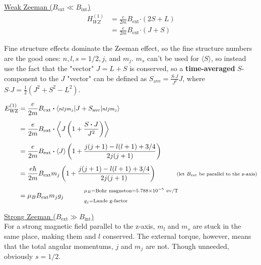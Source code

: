 \documentclass[12pt]{article}
\newcommand*{\dotP}{\boldsymbol \cdot}	%
\begin{document}
\vspace{5pt} \noindent
\underline{Weak Zeeman (\(B_\text{ext} \ll B_\text{int}\))}\\[-10pt]
\begin{align*}
    H_{WZ}^{(1)} &= \frac{e}{2m} B_\text{ext} \dotP (2S + L)  \\[5pt]
    &= \frac{e}{2m} B_\text{ext} \dotP ( J + S )
\end{align*}

\vspace{5pt}\noindent
Fine structure effects dominate the Zeeman effect, so the fine structure numbers are the good ones: 
\(n,l,s{\scriptstyle=1/2},j\), and \(m_j\). \(m_s\) can't be used for \(\langle S \rangle\), so instead use the fact that
the "vector" \(J = L+S\) is conserved, so a \textbf{time-averaged} \(S\)-component to the \(J\) "vector" can be defined as
\(S_\text{ave} = \frac{S \dotP J}{J^2} J\), where \(S \dotP J = \frac{1}{2} \left( J^2 + S^2 - L^2 \right)\).

\vspace{-10pt}
\begin{align*}
    E^{(1)}_\text{WZ} &= \frac{e}{2m} B_\text{ext} \dotP 
        \langle {\scriptstyle nljm_j} | J + S_\text{ave} | {\scriptstyle nljm_j}\rangle\\[5pt]
    &= \frac{e}{2m} B_\text{ext} \dotP 
        \left\langle J \left( 1 + \frac{S \dotP J}{J^2} \right) \right\rangle\\[5pt]
    &= \frac{e}{2m} B_\text{ext} \dotP \langle J \rangle 
        \left(1 + \frac{ j(j+1) - l(l+1) + 3/4 }{ 2 j (j+1) }\right)\\[5pt]
    &= \frac{e\hbar}{2m} B_\text{ext} m_j
        \left(1 + \frac{ j(j+1) - l(l+1) + 3/4 }{ 2 j (j+1) }\right)
        \indent \indent \text{\scriptsize(let \(B_\text{ext}\) be parallel to the z-axis)}\\[5pt]
    &= \mu_B B_\text{ext} m_j g_j \indent \indent \begin{aligned}
            &{\scriptstyle \mu_B = \text{Bohr magneton} = 5.788 \times 10^{-5} \ \text{ev/T}}\\
            &{\scriptstyle g_j = \text{Lande g-factor}}\\
        \end{aligned}
\end{align*}

\vspace{10pt}\noindent
\underline{Strong Zeeman (\(B_\text{ext} \gg B_\text{int}\))}\\[5pt]
For a strong magnetic field parallel to the z-axis, \(m_l\) and \(m_s\) are stuck in the same place, 
making them and \(l\) conserved. The external torque, however, means that the total angular momentums, 
\(j\) and \(m_j\) are not. Though unneeded, obviously \(s{\scriptstyle=1/2}\). 
\end{document}

